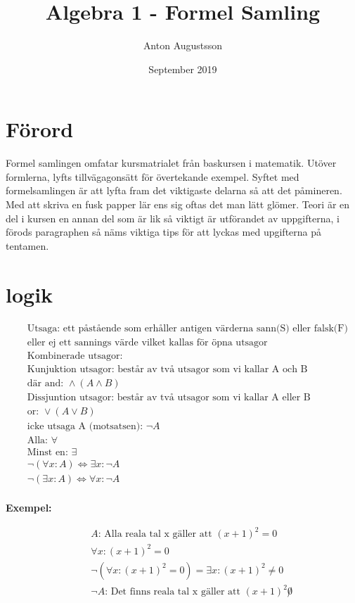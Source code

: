 \documentclass{article}
\title{Algebra 1 - Formel Samling}
\author{Anton Augustsson}
\date{September 2019}
\begin{document}
\maketitle

\newpage
\tableofcontents
\newpage

\section{Förord}
Formel samlingen omfatar kursmatrialet från baskursen i matematik. Utöver formlerna, lyfts tillvägagonsätt för övertekande exempel. Syftet med formelsamlingen är att lyfta fram det viktigaste delarna så att det påmineren. Med att skriva en fusk papper lär ens sig oftas det man lätt glömer. Teori är en del i kursen en annan del som är lik så viktigt är utförandet av uppgifterna, i förods paragraphen så näms viktiga tips för att lyckas med upgifterna på tentamen.


\newpage

\section{logik}
\begin{align*}
  &\quad \text{Utsaga: ett påstående som erhåller antigen värderna sann(S) eller falsk(F) vilket ge en stluten utsaga} \\
  &\quad \text{eller ej ett sannings värde vilket kallas för öpna utsagor} \\
  &\quad \text{Kombinerade utsagor:} \\
  &\quad \text{Kunjuktion utsagor: består av två utsagor som vi kallar A och B} \\
  &\quad \text{där and: } \land  (A \land B) \\
  &\quad \text{Dissjuntion utsagor: består av två utsagor som vi kallar A eller B} \\
  &\quad \text{or: } \lor  (A \lor B) \\
  &\quad \text{icke utsaga A (motsatsen): } \neg A \\
  &\quad \text{Alla: } \forall \\
  &\quad \text{Minst en: } \exists \\
  &\quad \neg(\forall x : A) \Leftrightarrow \exists x : \neg A \\
  &\quad \neg(\exists x : A) \Leftrightarrow \forall x : \neg A \\
\end{align*}

\textbf{Exempel:}\par
\begin{align*}
  &\quad A \text{: Alla reala tal x gäller att } (x+1)^2 = 0 \\
  &\quad \forall x : (x+1)^2 = 0 \\
  &\quad \neg(\forall x : (x+1)^2 = 0) = \exists x : (x+1)^2 \not = 0 \\
  &\quad \neg A \text{: Det finns reala tal x gäller att } (x+1)^2 \not 0 \\
\end{align*}
\end{document}
